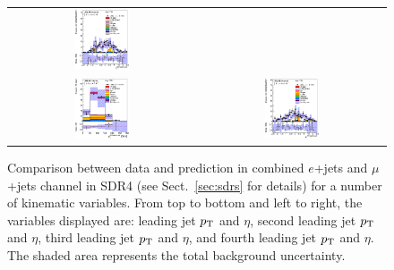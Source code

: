 \begin{figure}[htbp]
\begin{center}
\begin{tabular}{cc}
\includegraphics[width=0.30\textwidth]{appendices/figures/sdrs/JetEta3_ELEMUONCR3_1W_NOMINAL.eps} \\
\includegraphics[width=0.30\textwidth]{appendices/figures/sdrs/JetPt4_ELEMUONCR3_1W_NOMINAL.eps}  &
\includegraphics[width=0.30\textwidth]{appendices/figures/sdrs/JetEta4_ELEMUONCR3_1W_NOMINAL.eps}  \\
\end{tabular}\caption{\small {Comparison between data and prediction in combined $e$+jets and $\mu$+jets channel in SDR4 (see Sect.~\ref{sec:sdrs} for details) 
for a number of kinematic variables. From top to bottom and left to right, the variables displayed are: leading jet $\pt$ and $\eta$,  second leading jet $\pt$ and $\eta$,
third leading jet $\pt$ and $\eta$, and fourth leading jet $\pt$ and $\eta$. The shaded area represents the total background uncertainty.}}
\label{fig:ELEMUONCR3_2}
\end{center}
\end{figure}                                                                             

